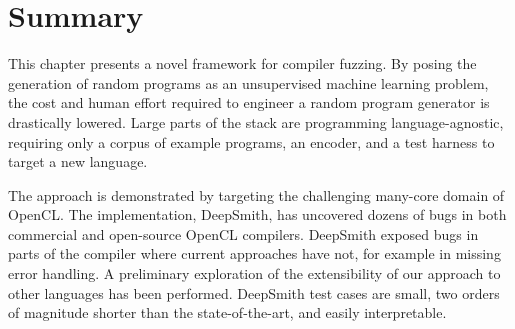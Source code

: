 \section{Summary}
\label{sec:deepsmith-conclusion}

This chapter presents a novel framework for compiler fuzzing. By posing the generation of random programs as an unsupervised machine learning problem, the cost and human effort required to engineer a random program generator is drastically lowered. Large parts of the stack are programming language-agnostic, requiring only a corpus of example programs, an encoder, and a test harness to target a new language.

The approach is demonstrated by targeting the challenging many-core domain of OpenCL. The implementation, DeepSmith, has uncovered dozens of bugs in both commercial and open-source OpenCL compilers. DeepSmith exposed bugs in parts of the compiler where current approaches have not, for example in missing error handling. A preliminary exploration of the extensibility of our approach to other languages has been performed. DeepSmith test cases are small, two orders of magnitude shorter than the state-of-the-art, and easily interpretable.

